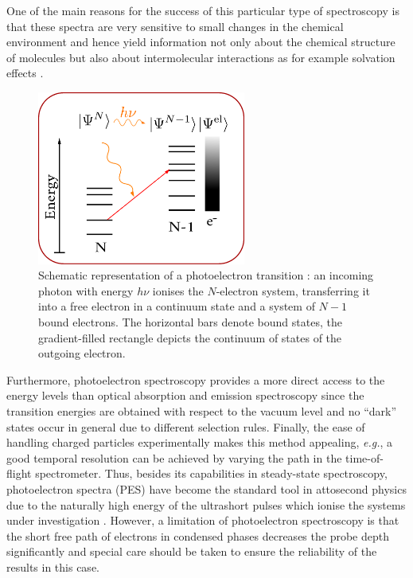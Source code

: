 One of the main reasons for the success of this particular type of spectroscopy is that these spectra are very sensitive to small changes in the chemical environment and hence yield information not only about the chemical structure of molecules but also about intermolecular interactions as for example solvation effects \cite{winterWater, solution1,solution2, solution3, solution4}.
\begin{figure}
   \includegraphics[width=0.61\textwidth]{Figures/PESscheme.eps}
   \caption{Schematic representation of a photoelectron transition : an incoming photon with energy $h\nu$ ionises the $N$-electron system, transferring it into a free electron in a continuum state and a system of $N-1$ bound electrons.
   The horizontal bars denote bound states, the gradient-filled rectangle depicts the continuum of states of the outgoing electron.}
   \label{fig:PESscheme}
\end{figure}
Furthermore, photoelectron spectroscopy provides a more direct access to the energy levels than optical absorption and emission spectroscopy since the transition energies are obtained with respect to the vacuum level and no ``dark'' states occur in general due to different selection rules.
Finally, the ease of handling charged particles experimentally makes this method appealing, \textit{e.g.}, a good temporal resolution can be achieved by varying the path in the time-of-flight spectrometer.
Thus, besides its capabilities in steady-state spectroscopy, photoelectron spectra (PES) have become the standard tool in attosecond physics due to the naturally high energy of the ultrashort pulses which ionise the systems under investigation \cite{as1, as2, as3, as4, as5, as6}.
However, a limitation of photoelectron spectroscopy is that the short free path of electrons in condensed phases decreases the probe depth significantly and special care should be taken to ensure the reliability of the results in this case.

